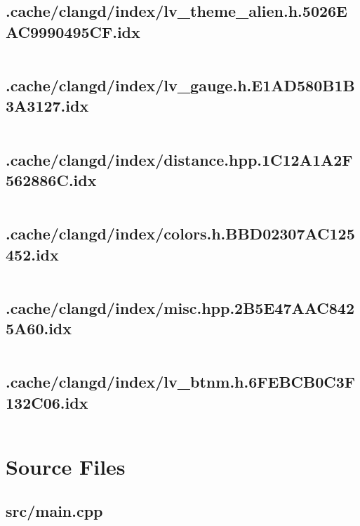 \subsection{.cache/clangd/index/lv_theme_alien.h.5026EAC9990495CF.idx}
\inputminted[linenos,tabsize=2,breaklines, breakanywhere]{c}{lv_theme_alien.h.5026EAC9990495CF.idx}
\pagebreak

\subsection{.cache/clangd/index/lv_gauge.h.E1AD580B1B3A3127.idx}
\inputminted[linenos,tabsize=2,breaklines, breakanywhere]{c}{lv_gauge.h.E1AD580B1B3A3127.idx}
\pagebreak

\subsection{.cache/clangd/index/distance.hpp.1C12A1A2F562886C.idx}
\inputminted[linenos,tabsize=2,breaklines, breakanywhere]{c}{distance.hpp.1C12A1A2F562886C.idx}
\pagebreak

\subsection{.cache/clangd/index/colors.h.BBD02307AC125452.idx}
\inputminted[linenos,tabsize=2,breaklines, breakanywhere]{c}{colors.h.BBD02307AC125452.idx}
\pagebreak

\subsection{.cache/clangd/index/misc.hpp.2B5E47AAC8425A60.idx}
\inputminted[linenos,tabsize=2,breaklines, breakanywhere]{c}{misc.hpp.2B5E47AAC8425A60.idx}
\pagebreak

\subsection{.cache/clangd/index/lv_btnm.h.6FEBCB0C3F132C06.idx}
\inputminted[linenos,tabsize=2,breaklines, breakanywhere]{c}{lv_btnm.h.6FEBCB0C3F132C06.idx}
\pagebreak

\section{Source Files}

\subsection{src/main.cpp}
\inputminted[linenos,tabsize=2,breaklines, breakanywhere]{c}{main.cpp}
\pagebreak

